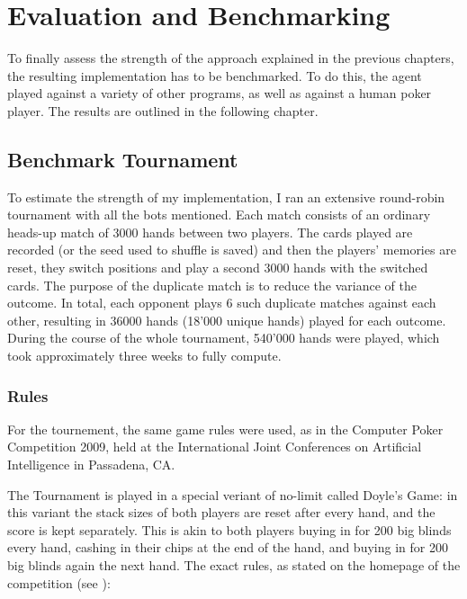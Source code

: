 

\chapter{Evaluation and Benchmarking}


To finally assess the strength of the approach explained in the previous chapters, the resulting implementation has to be benchmarked. To do this, the agent played against a variety of other programs, as well as against a human poker player. The results are outlined in the following chapter.
 

\section{Benchmark Tournament}

To estimate the strength of my implementation, I ran an extensive round-robin tournament with all the bots mentioned. Each match consists of an ordinary heads-up match of 3000 hands between two players. The cards played are recorded (or the seed used to shuffle is saved) and then the players' memories are reset, they switch positions and play a second 3000 hands with the switched cards. The purpose of the duplicate match is to reduce the variance of the outcome. In total, each opponent plays 6 such duplicate matches against each other, resulting in 36000 hands (18'000 unique hands) played for each outcome. During the course of the whole tournament, 540'000 hands were played, which took approximately three weeks to fully compute.

\subsection{Rules}
For the tournement, the same game rules were used, as in the Computer Poker Competition 2009, held at the International Joint Conferences on Artificial Intelligence in Passadena, CA.

The Tournament is played in a special veriant of no-limit called Doyle's Game: in this variant the stack sizes of both players are reset after every hand, and the score is kept separately. This is akin to both players buying in for 200 big blinds every hand, cashing in their chips at the end of the hand, and buying in for 200 big blinds again the next hand. The exact rules, as stated on the homepage of the competition (see \cite{Hawkin2009}):

